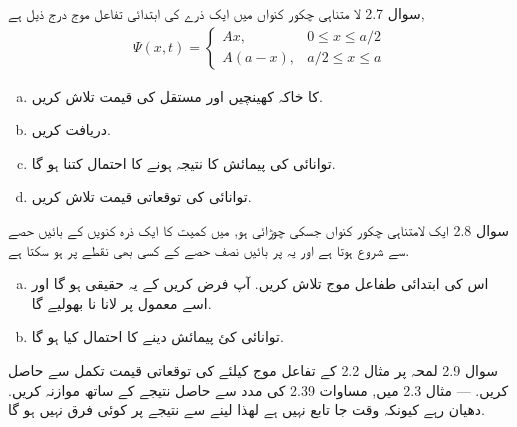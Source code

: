 سوال 2.7 
لا متناہی چکور کنواں میں ایک ذرے کی ابتدائی تفاعل موج درج ذیل ہے,
\begin{align*}
\Psi (x,t) = \left\{ \begin{array}{lc}
Ax, & 0 \leq x \leq a/2 \\ A(a-x), & a/2 \leq x \leq a
\end{array} \right.
\end{align*}
\begin{enumerate}[a.]
\item 
{} کا خاکہ کھینچیں اور مستقل  کی قیمت تلاش کریں.
\item  
{} دریافت کریں.
\item  
توانائی کی پیمائش کا نتیجہ  ہونے کا احتمال کتنا ہو گا.
\item 
توانائی کی توقعاتی قیمت تلاش کریں.
\end{enumerate}
سوال 2.8 
ایک لامتناہی چکور کنواں جسکی چوڑائی  ہو, میں کمیت  کا ایک ذرہ کنویں کے بائیں حصے سے شروع ہوتا ہے اور یہ  پر بائیں نصف حصے کے کسی بھی نقطے پر ہو سکتا ہے.
\begin{enumerate}[a.]
\item
اس کی ابتدائی طفاعل موج  تلاش کریں. آپ فرض کریں کے یہ حقیقی ہو گا اور اسے معمول پر لانا نا بھولیے گا.
\item 
توانائی کئ پیمائش  دینے کا احتمال کیا ہو گا. 
\end{enumerate} 
سوال 2.9 
لمحہ   پر مثال 2.2 کے تفاعل موج کیلئے  کی توقعاتی قیمت تکمل سے حاصل کریں. 
---
مثال 2.3 میں, مساوات 2.39 کی مدد سے حاصل نتیجے کے ساتھ موازنہ کریں. دھیان رہے کیونکہ  وقت جا تابع نہیں ہے لھذا  لینے سے نتیجے پر کوئی فرق نہیں ہو گا. 



